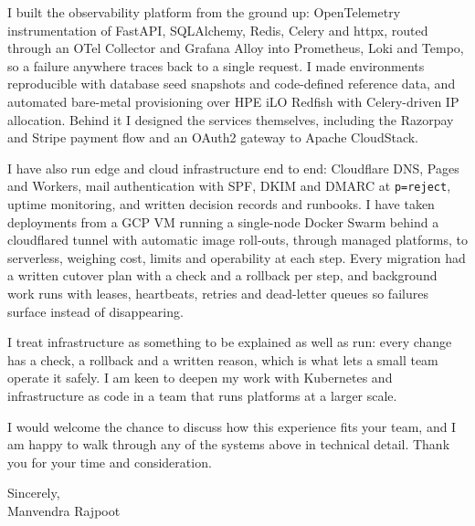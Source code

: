 \documentclass[11pt,a4paper]{article}
\begin{document}
I built the observability platform from the ground up: OpenTelemetry instrumentation
of FastAPI, SQLAlchemy, Redis, Celery and httpx, routed through an OTel Collector and
Grafana Alloy into Prometheus, Loki and Tempo, so a failure anywhere traces back to a
single request. I made environments reproducible with database seed snapshots and
code-defined reference data, and automated bare-metal provisioning over HPE iLO Redfish
with Celery-driven IP allocation. Behind it I designed the services themselves, including
the Razorpay and Stripe payment flow and an OAuth2 gateway to Apache CloudStack.

I have also run edge and cloud infrastructure end to end: Cloudflare DNS, Pages and
Workers, mail authentication with SPF, DKIM and DMARC at \texttt{p=reject}, uptime
monitoring, and written decision records and runbooks. I have taken deployments from a
GCP VM running a single-node Docker Swarm behind a cloudflared tunnel with automatic
image roll-outs, through managed platforms, to serverless, weighing cost, limits and
operability at each step. Every migration had a written cutover plan with a check and a
rollback per step, and background work runs with leases, heartbeats, retries and
dead-letter queues so failures surface instead of disappearing.

I treat infrastructure as something to be explained as well as run: every change has a
check, a rollback and a written reason, which is what lets a small team operate it safely. I am
keen to deepen my work with Kubernetes and infrastructure as code in a team that runs
platforms at a larger scale.

I would welcome the chance to discuss how this experience fits your team, and I am
happy to walk through any of the systems above in technical detail. Thank you for your
time and consideration.


Sincerely,\\[6pt]
Manvendra Rajpoot
\end{document}
